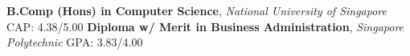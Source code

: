 %
%
%


\begin{education}
					{\textbf{B.Comp (Hons) in Computer Science}, \textit{National University of Singapore}}
	\educationentry{} {CAP: 4.38/5.00}
					{\textbf{Diploma w/ Merit in Business Administration}, \textit{Singapore Polytechnic}}
	\educationentry{} {GPA: 3.83/4.00}
\end{education}
